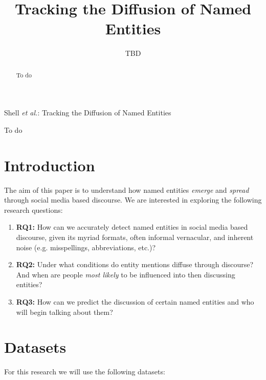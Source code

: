 \documentclass[journal,10pt,draftclsnofoot,onecolumn]{IEEEtran}
\begin{document}
\title{Tracking the Diffusion of Named Entities}


\author{TBD}%

{Shell \MakeLowercase{\textit{et al.}}: Tracking the Diffusion of Named Entities}

\maketitle

\begin{abstract}
To do
\end{abstract}

\begin{IEEEkeywords}
To do
\end{IEEEkeywords}

\IEEEpeerreviewmaketitle



\section{Introduction}

The aim of this paper is to understand how named entities \emph{emerge} and \emph{spread} through social media based discourse.
We are interested in exploring the following research questions:
\begin{enumerate}
	\item \textbf{RQ1:} How can we accurately detect named entities in social media based discourse, given its myriad formats, often informal vernacular, and inherent noise (e.g. misspellings, abbreviations, etc.)?
	\item \textbf{RQ2:} Under what conditions do entity mentions diffuse through discourse? And when are people \emph{most likely} to be influenced into then discussing entities?
	\item \textbf{RQ3:} How can we predict the discussion of certain named entities and who will begin talking about them?	
\end{enumerate}


\section{Datasets}
For this research we will use the following datasets:
\end{document}
